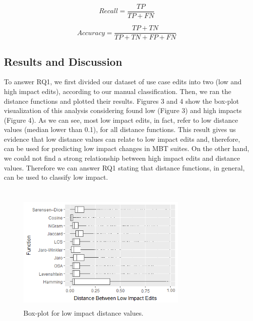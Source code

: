 \begin{equation} \label{eq:recall}
Recall = \frac{TP}{TP+FN}
\end{equation}

\begin{equation} \label{eq:acc}
Accuracy = \frac{TP+TN}{TP+TN+FP+FN}
\end{equation}


\subsection{Results and Discussion} \label{sec:res}

To answer RQ1, we first divided our dataset of use case edits into two (low and high impact edits), according to our manual classification. Then, we ran the distance functions and plotted their results. Figures 3 and 4 show the box-plot visualization of this analysis considering found low (Figure 3) and high impacts (Figure 4). As we can see, most low impact edits, in fact, refer to low distance values (median lower than 0.1), for all distance functions. This result gives us evidence that low distance values can relate to low impact edits and, therefore, can be used for predicting low impact changes in MBT suites. On the other hand, we could not find a strong relationship between high impact edits and distance values. Therefore we can answer RQ1 stating that distance functions, in general, can be used to classify low impact.
\\
\\
\noindent
\vspace{2mm} %
\vspace{2mm}




\begin{figure}[h]
\centering
\includegraphics[height=2.3in,width=3.3in]{figs/Boxplot_SAFF_BZT_LOW2.png}
\caption{Box-plot for low impact distance values.}
\label{fig:bp_dist_l}
\end{figure}

